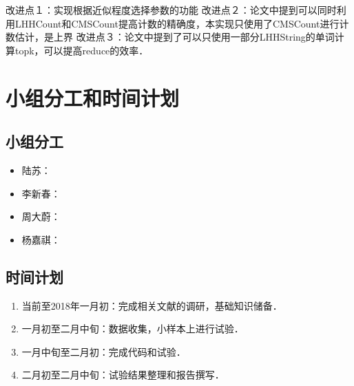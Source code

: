 \documentclass[a4paper,UTF8]{article}
\numberwithin{equation}{section}
\begin{document}
改进点１：实现根据近似程度选择参数的功能
改进点２：论文中提到可以同时利用LHHCount和CMSCount提高计数的精确度，本实现只使用了CMSCount进行计数估计，是上界
改进点３：论文中提到了可以只使用一部分LHHString的单词计算topk，可以提高reduce的效率．

\section{小组分工和时间计划}

\subsection{小组分工}

\begin{itemize}
主要任务
数据生成和预处理，统筹安排
性能优化，对比实验，实验设计
算法实现hadoop
算法实现c++
实现了FA(c++), topkapi(c++), topkapi(mapreduce), Zipf数据生成(c++), 辅助脚本(py, bash)
课程设计选题和可行性分析，mapreduce算法设计，实验报告撰写

\item 陆苏：
\item 李新春：
\item 周大蔚：
\item 杨嘉祺：
\end{itemize}

\subsection{时间计划}

\begin{enumerate}
\item 当前至2018年一月初：完成相关文献的调研，基础知识储备．
\item 一月初至二月中旬：数据收集，小样本上进行试验．
\item 一月中旬至二月初：完成代码和试验．
\item 二月初至二月中旬：试验结果整理和报告撰写．
\end{enumerate}


\nocite{*}


\end{document}
